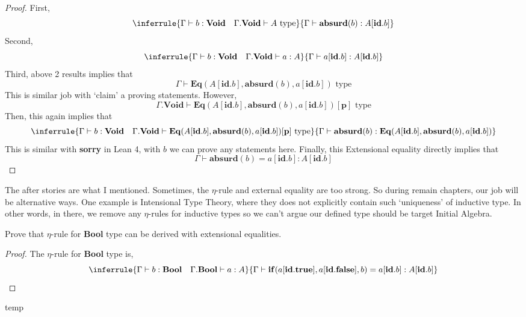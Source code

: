 \documentclass[12pt, a4paper, openany, twoside]{book}
\theoremstyle{definition}
\theoremstyle{remark}
\theoremstyle{plain}
\numberwithin{equation}{section}
\begin{document}
\begin{proof}
First, 
\[
\inferrule
{
    \Gamma \vdash b : \mathbf{Void} \quad \Gamma.\mathbf{Void} \vdash A \text{ type}
}
{
    \Gamma \vdash \mathbf{absurd}(b) : A[\mathbf{id}.b]
}
\]
Second, 
\[
\inferrule
{
    \Gamma \vdash b : \textbf{Void} \quad \Gamma.\mathbf{Void} \vdash a : A 
}
{
    \Gamma \vdash a[\mathbf{id}.b] : A[\mathbf{id}.b]
}
\]
Third, above 2 results implies that 
\[\Gamma \vdash \mathbf{Eq}(A[\mathbf{id}.b], \mathbf{absurd}(b), a[\mathbf{id}.b]) \text{ type}\]
This is similar job with \lq claim' a proving statements. However, 
\[\Gamma.\mathbf{Void} \vdash \mathbf{Eq}(A[\mathbf{id}.b], \mathbf{absurd}(b), a[\mathbf{id}.b])[\mathbf{p}] \text{ type}\]
Then, this again implies that 
\[
\inferrule
{
    \Gamma \vdash b : \mathbf{Void} \quad \Gamma.\mathbf{Void} \vdash \mathbf{Eq}(A[\mathbf{id}.b], \mathbf{absurd}(b), a[\mathbf{id}.b])[\mathbf{p}] \text{ type}
}
{
    \Gamma \vdash \mathbf{absurd}(b) : \mathbf{Eq}(A[\mathbf{id}.b], \mathbf{absurd}(b), a[\mathbf{id}.b])
}
\]
This is similar with \textbf{sorry} in Lean 4, with $b$ we can prove any statements here. Finally, this Extensional equality directly implies that 
\[\Gamma \vdash \mathbf{absurd}(b) = a[\mathbf{id}.b] : A[\mathbf{id}.b]\]
\end{proof}
\noindent The after stories are what I mentioned. Sometimes, the $\eta$-rule and external equality are too strong. 
So during remain chapters, our job will be alternative ways. One example is Intensional Type Theory, where
they does not explicitly contain such \lq uniqueness' of inductive type. In other words, 
in there, we remove any $\eta$-rules for inductive types so we can't argue our 
defined type should be target Initial Algebra. 

\begin{tcolorbox}[breakable, colback=yellow!10!white,colframe=brown!75!black,title=Exercise 4.1.2.]\hypertarget{Exer 4.1.2}{}
Prove that $\eta$-rule for \textbf{Bool} type can be derived with extensional equalities. 

\begin{proof}
The $\eta$-rule for \textbf{Bool} type is, 
\[
\inferrule
{
    \Gamma \vdash b : \mathbf{Bool} \quad \Gamma.\mathbf{Bool} \vdash a : A
}
{
    \Gamma \vdash \mathbf{if}(a[\mathbf{id.true}], a[\mathbf{id.false}], b) = a[\mathbf{id}.b] : A[\mathbf{id}.b]
}
\]

\end{proof}

\end{tcolorbox}

\newpage
temp 
\end{document}
